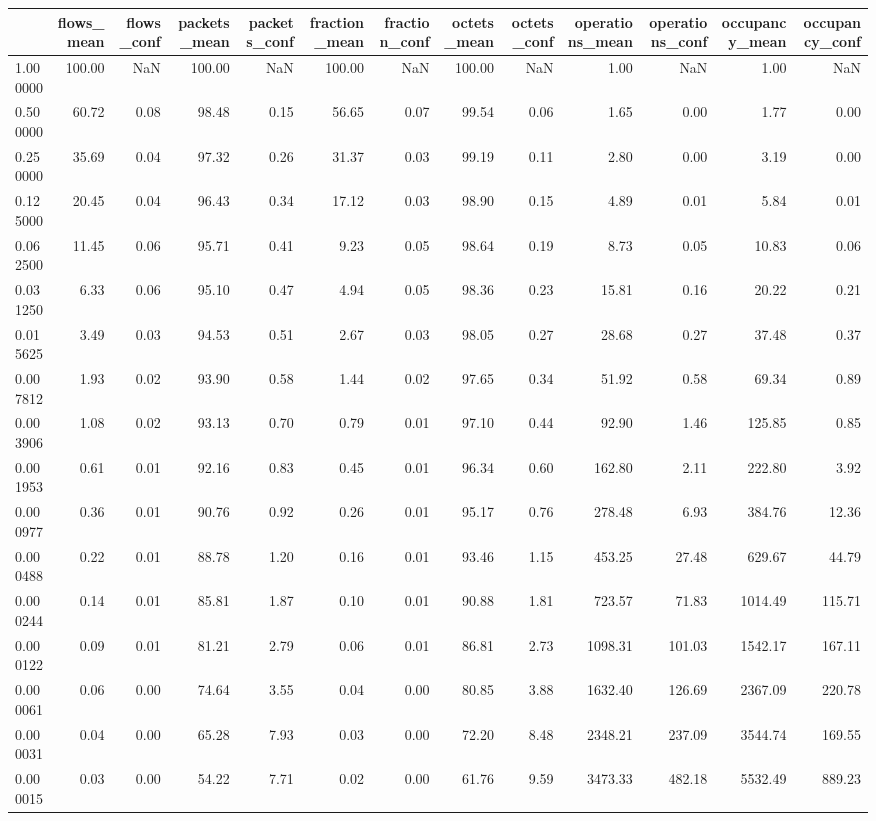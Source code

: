 \begin{tabular}{lrrrrrrrrrrrr}
\toprule
 & flows_mean & flows_conf & packets_mean & packets_conf & fraction_mean & fraction_conf & octets_mean & octets_conf & operations_mean & operations_conf & occupancy_mean & occupancy_conf \\
\midrule
1.000000 & 100.00 & NaN & 100.00 & NaN & 100.00 & NaN & 100.00 & NaN & 1.00 & NaN & 1.00 & NaN \\
0.500000 & 60.72 & 0.08 & 98.48 & 0.15 & 56.65 & 0.07 & 99.54 & 0.06 & 1.65 & 0.00 & 1.77 & 0.00 \\
0.250000 & 35.69 & 0.04 & 97.32 & 0.26 & 31.37 & 0.03 & 99.19 & 0.11 & 2.80 & 0.00 & 3.19 & 0.00 \\
0.125000 & 20.45 & 0.04 & 96.43 & 0.34 & 17.12 & 0.03 & 98.90 & 0.15 & 4.89 & 0.01 & 5.84 & 0.01 \\
0.062500 & 11.45 & 0.06 & 95.71 & 0.41 & 9.23 & 0.05 & 98.64 & 0.19 & 8.73 & 0.05 & 10.83 & 0.06 \\
0.031250 & 6.33 & 0.06 & 95.10 & 0.47 & 4.94 & 0.05 & 98.36 & 0.23 & 15.81 & 0.16 & 20.22 & 0.21 \\
0.015625 & 3.49 & 0.03 & 94.53 & 0.51 & 2.67 & 0.03 & 98.05 & 0.27 & 28.68 & 0.27 & 37.48 & 0.37 \\
0.007812 & 1.93 & 0.02 & 93.90 & 0.58 & 1.44 & 0.02 & 97.65 & 0.34 & 51.92 & 0.58 & 69.34 & 0.89 \\
0.003906 & 1.08 & 0.02 & 93.13 & 0.70 & 0.79 & 0.01 & 97.10 & 0.44 & 92.90 & 1.46 & 125.85 & 0.85 \\
0.001953 & 0.61 & 0.01 & 92.16 & 0.83 & 0.45 & 0.01 & 96.34 & 0.60 & 162.80 & 2.11 & 222.80 & 3.92 \\
0.000977 & 0.36 & 0.01 & 90.76 & 0.92 & 0.26 & 0.01 & 95.17 & 0.76 & 278.48 & 6.93 & 384.76 & 12.36 \\
0.000488 & 0.22 & 0.01 & 88.78 & 1.20 & 0.16 & 0.01 & 93.46 & 1.15 & 453.25 & 27.48 & 629.67 & 44.79 \\
0.000244 & 0.14 & 0.01 & 85.81 & 1.87 & 0.10 & 0.01 & 90.88 & 1.81 & 723.57 & 71.83 & 1014.49 & 115.71 \\
0.000122 & 0.09 & 0.01 & 81.21 & 2.79 & 0.06 & 0.01 & 86.81 & 2.73 & 1098.31 & 101.03 & 1542.17 & 167.11 \\
0.000061 & 0.06 & 0.00 & 74.64 & 3.55 & 0.04 & 0.00 & 80.85 & 3.88 & 1632.40 & 126.69 & 2367.09 & 220.78 \\
0.000031 & 0.04 & 0.00 & 65.28 & 7.93 & 0.03 & 0.00 & 72.20 & 8.48 & 2348.21 & 237.09 & 3544.74 & 169.55 \\
0.000015 & 0.03 & 0.00 & 54.22 & 7.71 & 0.02 & 0.00 & 61.76 & 9.59 & 3473.33 & 482.18 & 5532.49 & 889.23 \\

\end{tabular}
